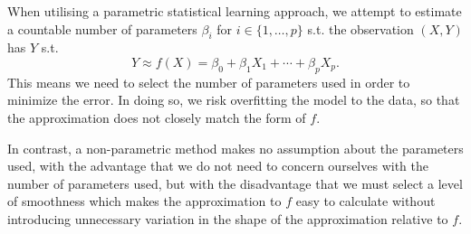 
When utilising a parametric statistical learning approach, we attempt to estimate
a countable number of parameters $\beta_i$ for $i \in \lbrace 1, \dotsc, p \rbrace$
s.t. the observation $(X, Y)$ has $Y$ s.t.
\[
    Y \approx f(X) = \beta_0 + \beta_1 X_1 + \dotsb + \beta_p X_p.
\]
This means we need to select the number of parameters used in order to minimize
the error. In doing so, we risk overfitting the model to the data, so that the 
approximation does not closely match the form of $f$.\par
\qquad In contrast, a non-parametric method makes no assumption about the parameters 
used, with the advantage that we do not need to concern ourselves with the number of
parameters used, but with the disadvantage that we must select a level of 
smoothness which makes the approximation to $f$ easy to calculate without 
introducing unnecessary variation in the shape of the approximation relative to $f$.

